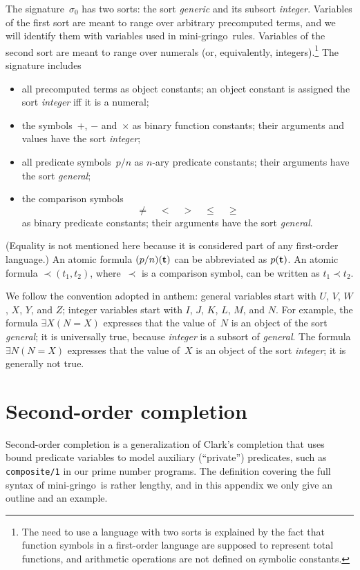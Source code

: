 \documentclass{new_tlp}
\def\gringo{{\sc gringo}}
\begin{document}
The signature~$\sigma_0$ \cite[Section~2.2]{fan22}
has two sorts: the sort \emph{generic} and its subsort
\emph{integer}.
Variables of the first sort are meant to
range over arbitrary precomputed terms, and we will identify them with
variables used in mini-\gringo\ rules.  Variables of the second sort are meant
to range over numerals (or, equivalently, integers).\footnote{The need to
  use a language with two sorts is explained by the fact that function symbols
in a first-order language are supposed to represent total functions, and
arithmetic operations are not defined on symbolic constants.}
The signature includes
\begin{itemize}
\item all precomputed terms as object constants; an object constant
  is assigned the sort \emph{integer} iff it is a numeral;
\item the symbols~$+$, $-$ and~$\times$ as binary function constants;
  their arguments and values have the sort \emph{integer};
\item all predicate symbols~$p/n$ as $n$-ary predicate
  constants; their arguments have the sort \emph{general};
\item the comparison symbols
$$\neq\quad<\quad>\quad\leq\quad\geq$$
as binary predicate constants; their arguments have the sort \emph{general}.
\end{itemize}
(Equality is not mentioned here because it is considered part of any
first-order language.)  An atomic formula $(p/n)({\bf t})$ can be abbreviated
as $p({\bf t})$. An atomic formula $\prec\!\!(t_1,t_2)$, where~$\prec$ is a
comparison symbol, can be written as $t_1\prec t_2$.

We follow the convention adopted in {\sc anthem\/}:
general variables start with $U$, $V$, $W$, $X$, $Y$, and $Z$;
integer variables start with $I$, $J$, $K$, $L$, $M$, and $N$.
For example, the formula
$\exists X (N=X)$ expresses that the value of~$N$ is an object of the sort
\emph{general\/};  it is universally true, because \emph{integer} is a
subsort of \emph{general}.  The formula
$\exists N (N=X)$ expresses that the value of~$X$ is an object of the sort
\emph{integer\/}; it is generally not true.

\section{Second-order completion} \label{appb}

Second-order completion \cite[Sections~6.1,~6.2]{fan20}
is a generalization of Clark's completion
\cite{cla78} that uses bound predicate variables to model auxiliary
(``private'') predicates, such as \verb|composite/1| in our prime number
programs.  The definition covering the full
syntax of mini-\gringo\ is rather lengthy, and in this appendix we only give
an outline and an example.
\end{document}
